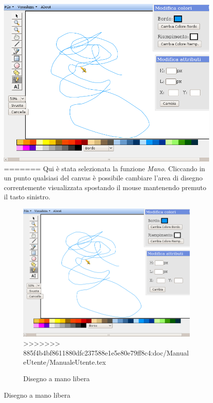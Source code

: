 \begin{figure}[!ht]
\centering
\includegraphics[scale=0.4]{images/matita.png}
=======
Qui \`e stata selezionata la funzione \textit{Mano}. Cliccando in un punto qualsiasi del canvas \`e possibile cambiare l'area di disegno correntemente visualizzata spostando il mouse mantenendo premuto il tasto sinistro.

\begin{figure}[!ht]
\centering
\includegraphics[scale=1]{images/matita.png}
>>>>>>> 885f4b4bf8611880dfc237588e1e5e80e79ff8c4:doc/ManualeUtente/ManualeUtente.tex
\caption{Disegno a mano libera}
\end{figure} 


\end{figure}
